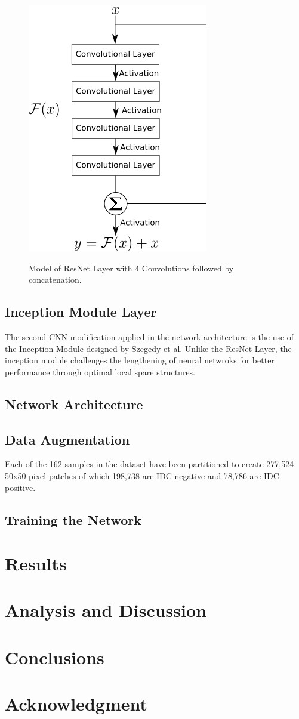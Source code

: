 \documentclass[conference]{IEEEtran}
\begin{document}
\begin{figure}
\centering
\includegraphics[scale=0.65]{figures/ResNet_Model.png}
\label{ResNet Layer Model}
\caption{Model of ResNet Layer with 4 Convolutions followed by concatenation.}
\end{figure}

\subsection{Inception Module Layer}
The second CNN modification applied in the network architecture is the use of the Inception Module \cite{Szegedy2014} designed by Szegedy et al. Unlike the ResNet Layer, the inception module challenges the lengthening of neural netwroks for better performance through optimal local spare structures.

\subsection{Network Architecture}
\subsection{Data Augmentation}
Each of the 162 samples in the dataset have been partitioned to create 277,524 50x50-pixel patches of which 198,738 are IDC negative and 78,786 are IDC positive. 
\subsection{Training the Network}

\section{Results}

\section{Analysis and Discussion}

\section{Conclusions}

\section*{Acknowledgment}


\end{document}
